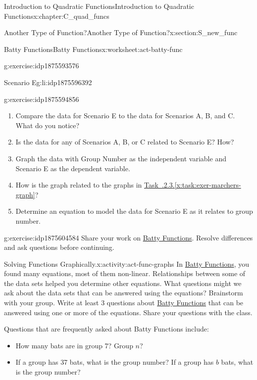 \documentclass[oneside,10pt,]{book}
\newcommand{\xreffont}{\relax}
\numberwithin{equation}{chapter}
\begin{document}
\begin{chapterptx}{Introduction to Quadratic Functions}{}{Introduction to Quadratic Functions}{}{}{x:chapter:C_quad_funcs}
\begin{sectionptx}{Another Type of Function?}{}{Another Type of Function?}{}{}{x:section:S_new_func}
\begin{worksheet-subsection}{Batty Functions}{}{Batty Functions}{}{}{x:worksheet:act-batty-func}
\begin{divisionexercise}{5}{}{}{g:exercise:idp1875593576}
\begin{descriptionlist}
\begin{dlimedium}{Scenario E}{g:li:idp1875596392}
\end{dlimedium}%
\end{descriptionlist}
%
\end{divisionexercise}%
\begin{divisionexercise}{6}{}{}{g:exercise:idp1875594856}%
\begin{enumerate}[font=\bfseries,label=(\alph*),ref=\alph*]
\item{}Compare the data for Scenario E to the data for Scenarios A, B, and C. What do you notice?%
\item{}Is the data for any of Scenarios A, B, or C related to Scenario E? How?%
\item{}Graph the data with Group Number as the independent variable and Scenario E as the dependent variable.%
\item{}How is the graph related to the graphs in \hyperref[x:task:exer-marchers-graph]{Task~{\xreffont 4.1.2.3}.{\xreffont\ref{x:task:exer-marchers-graph}}}?%
\item{}Determine an equation to model the data for Scenario E as it relates to group number.%
\end{enumerate}
\end{divisionexercise}%
\begin{divisionexercise}{7}{}{}{g:exercise:idp1875604584}%
Share your work on \hyperref[x:worksheet:act-batty-func]{Batty Functions}. Resolve differences and ask questions before continuing.%
\end{divisionexercise}%
\end{worksheet-subsection}
\restoregeometry
\begin{activity}{Solving Functions Graphically.}{x:activity:act-func-graphs}%
In \hyperref[x:worksheet:act-batty-func]{Batty Functions}, you found many equations, most of them non-linear. Relationships between some of the data sets helped you determine other equations. What questions might we ask about the data sets that can be answered using the equations? Brainstorm with your group. Write at least 3 questions about \hyperref[x:worksheet:act-batty-func]{Batty Functions} that can be answered using one or more of the equations. Share your questions with the class.%
\par
Questions that are frequently asked about Batty Functions include:%
\begin{itemize}[label=\textbullet]
\item{}How many bats are in group 7? Group \(n\)?%
\item{}If a group has 37 bats, what is the group number? If a group has \(b\) bats, what is the group number?%

\end{itemize}
\end{activity}
\end{sectionptx}
\end{chapterptx}
\end{document}
